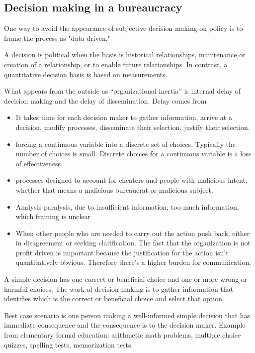 \subsection{Decision making in a bureaucracy}


One way to avoid the appearance of subjective decision making on policy is to frame the process as "data driven." 


A decision is political when the basis is historical relationships, maintenance or creation of a relationship, or to enable future relationships.
In contrast, a quantitative decision basis is based on measurements.


What appears from the outside as ``organizational inertia'' is internal delay of decision making and the delay of dissemination. 
Delay comes from
\begin{itemize}
    \item It takes time for each decision maker to gather information, arrive at a decision, modify processes, disseminate their selection, justify their selection. 
    \item forcing a continuous variable into a discrete set of choices. Typically the number of choices is small. Discrete choices for a continuous variable is a loss of effectiveness.
    \item processes designed to account for cheaters and people with malicious intent, whether that means a malicious bureaucrat or malicious subject. 
\item Analysis paralysis, due to {insufficient information, too much information, which framing is unclear}
\item When other people who are needed to carry out the action push back, either in disagreement or seeking clarification. The fact that the organization is not profit driven is important because the justification for the action isn't quantitatively obvious. Therefore there's a higher burden for communication.
\end{itemize}


A \gls{simple decision} has one correct or beneficial choice and one or more wrong or harmful choices. The work of decision making is to gather information that identifies which is the correct or beneficial choice and select that option.

Best case scenario is one person making a well-informed simple decision that has immediate consequence and the consequence is to the decision maker. Example from elementary formal education: arithmetic math problems, multiple choice quizzes, spelling tests, memorization tests. 

